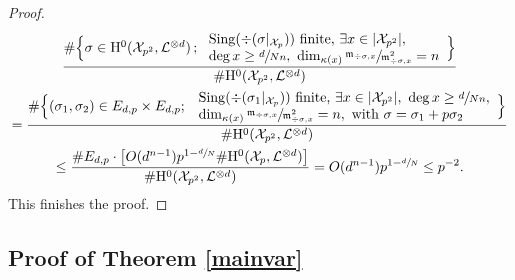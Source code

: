 \documentclass[JEP,XML,SOM,Unicode,published]{cedram}
\newcommand{\sep}{\,;\,}
\theoremstyle{plain}
\theoremstyle{definition}
\newcommand{\ho}{\mathrm{H}}
\newcommand{\X}{\mathcal{X}}
\newcommand{\li}{\mathcal{L}}
\begin{document}
\begin{proof}
\begin{multline*}
\frac{\#
\Bigl\{ \sigma\in \ho^0(\X_{p^2}, \li^{\otimes d})\sep \begin{array}{ll}
\mathrm{Sing}(\div (\sigma|_{\X_p})) \text{ finite,}\ \exists x\in |\X_{p^2}|,\\ \deg x\geq \sfrac{d}{Nn},\ \dim_{\kappa(x)}\sfrac{\mathfrak{m}_{\div \sigma,x}}{\mathfrak{m}_{\div \sigma,x}^2}=n
\end{array} \Bigr\}}{\#\ho^0(\X_{p^2}, \li^{\otimes d})}\\
=\frac{\#\Bigl\{ (\sigma_1,\sigma_2)\in E_{d,p}\times E_{d,p};\
\begin{array}{ll}
\mathrm{Sing}(\div (\sigma_1|_{\X_p})) \text{ finite,}\ \exists x\in |\X_{p^2}|,\ \deg x\geq \sfrac{d}{Nn}, \\ \dim_{\kappa(x)}\sfrac{\mathfrak{m}_{\div \sigma,x}}{\mathfrak{m}_{\div \sigma,x}^2}=n, \text{ with }\sigma=\sigma_1+p\sigma_2
\end{array}
\Bigr\}}{\#\ho^0(\X_{p^2}, \li^{\otimes d})}\\
\leq \frac{\#E_{d,p}\cdot \bigl[O(d^{n-1}) p^{1-\sfrac{d}{N}}\#\ho^0(\X_p, \li^{\otimes d})\bigr]}{\#\ho^0(\X_{p^2}, \li^{\otimes d})}=O(d^{n-1}) p^{1-\sfrac{d}{N}}\leq p^{-2}.
\end{multline*}
This finishes the proof.
\end{proof}

\subsection{Proof of Theorem \ref{mainvar}}\label{finalarakelov}
\end{document}
